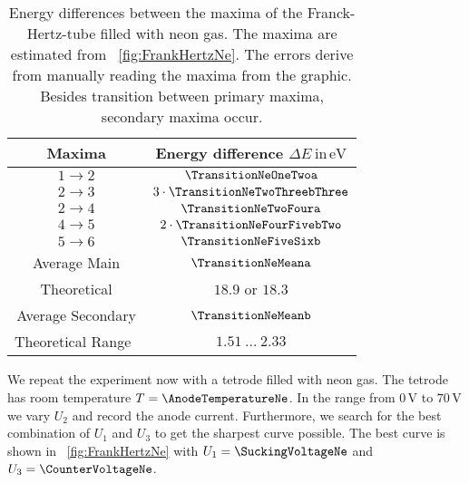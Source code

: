 \documentclass[a4paper,10pt,twocolumn]{article}
\newcommand{\volt}{\, \mathrm{V}}
\newcommand{\eV}{\, \mathrm{eV}}
\newcommand{\TheoreticalTransitionNea}{18.9}
\newcommand{\TheoreticalTransitionNeaa}{18.3}
\newcommand{\TheoreticalTransitionNeb}{1.51 \ \dots \ 2.33}
\begin{document}
    \begin{table}[httb]
        \centering
        \begin{tabular}{c c}
            \hline \hline
            Maxima & Energy difference $\Delta E \ \mathrm{in} \eV$ \\
            \hline
            $1 \rightarrow 2$ & $\TransitionNeOneTwoa$ \\
            $2 \rightarrow 3$ & $3 \cdot \TransitionNeTwoThreebThree$ \\
            $2 \rightarrow 4$ & $\TransitionNeTwoFoura$ \\
            $4 \rightarrow 5$ & $2 \cdot \TransitionNeFourFivebTwo$ \\
            $5 \rightarrow 6$ & $\TransitionNeFiveSixb$ \\
            \hline
            Average Main & $\TransitionNeMeana$\\
            Theoretical & $\TheoreticalTransitionNea$ or $\TheoreticalTransitionNeaa$ \\
            Average Secondary & $\TransitionNeMeanb$ \\
            Theoretical Range~\cite{neonSpectrum} & $\TheoreticalTransitionNeb$ \\
            \hline
            \hline
        \end{tabular}
        \caption{Energy differences between the maxima of the Franck-Hertz-tube filled with neon gas.
        The maxima are estimated from ~\autoref{fig:FrankHertzNe}.
        The errors derive from manually reading the maxima from the graphic.
        Besides transition between primary maxima, secondary maxima occur.
        }
        \label{tab:transitionNe}
    \end{table}

    We repeat the experiment now with a tetrode filled with neon gas.
    The tetrode has room temperature $T = \AnodeTemperatureNe$.
    In the range from $0\volt$ to $70\volt$ we vary $U_2$ and record the anode current.
    Furthermore, we search for the best combination of $U_1$ and $U_3$ to get the sharpest curve possible.
    The best curve is shown in ~\autoref{fig:FrankHertzNe} with $U_1 = \SuckingVoltageNe$ and $U_3 = \CounterVoltageNe$.
    
\end{document}
